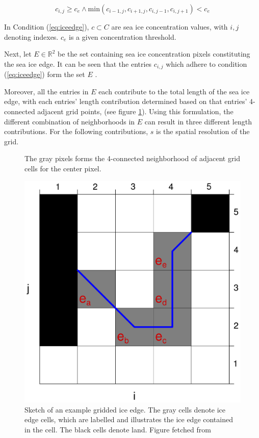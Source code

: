 \documentclass[../main/thesis.tex]{subfiles}
\begin{document}
\begin{equation}
    \label{eq:iceedge}
    c_{i,j} \geq c_e \wedge \text{min}{(c_{i-1,j},c_{i+1,j},c_{i,j-1},c_{i,j+1})} < c_e
\end{equation}

In Condition (\ref{eq:iceedge}), $c \subset C$ are sea ice concentration values, with $i,j$ denoting indexes. $c_e$ is a given concentration threshold.

Next, let $E \in{\mathbb{R}^2}$ be the set containing sea ice concentration pixels constituting the sea ice edge. It can be seen that the entries $c_{i,j}$ which adhere to condition (\ref{eq:iceedge}) form the set $E$ \citep{Melsom2019}.

Moreover, all the entries in $E$ each contribute to the total length of the sea ice edge, with each entries' length contribution determined based on that entries' 4-connected adjacent grid points, (see figure \ref{fig:4-connection}). Using this formulation, the different combination of neighborhoods in $E$ can result in three different length contributions. For the following contributions, $s$ is the spatial resolution of the grid.

\begin{figure}
    \centering
    
    \caption{\label{fig:4-connection}The gray pixels forms the 4-connected neighborhood of adjacent grid cells for the center pixel.}
\end{figure}

\begin{figure}
    \centering
    \includegraphics[width = .5\textwidth]{MelsomIEL.pdf}
    \caption{\label{fig:iceedgeschematic}Sketch of an example gridded ice edge. The gray cells denote ice edge cells, which are labelled and illustrates the ice edge contained in the cell. The black cells denote land. Figure fetched from \protect\citet{Melsom2019}}
\end{figure}
\end{document}
